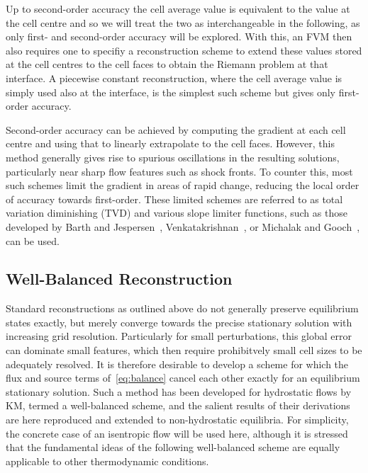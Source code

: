 Up to second-order accuracy the cell average value is equivalent to the value at the cell centre and so we will treat the two as interchangeable in the following, as only first- and second-order accuracy will be explored. With this, an FVM then also requires one to specifiy a reconstruction scheme to extend these values stored at the cell centres to the cell faces to obtain the Riemann problem at that interface. A piecewise constant reconstruction, where the cell average value is simply used also at the interface, is the simplest such scheme but gives only first-order accuracy.

Second-order accuracy can be achieved by computing the gradient at each cell centre and using that to linearly extrapolate to the cell faces. However, this method generally gives rise to spurious oscillations in the resulting solutions, particularly near sharp flow features such as shock fronts. To counter this, most such schemes limit the gradient in areas of rapid change, reducing the local order of accuracy towards first-order. These limited schemes are referred to as total variation diminishing (TVD) and various slope limiter functions, such as those developed by Barth and Jespersen~\cite{Barth1989}, Venkatakrishnan~\cite{Venkatakrishnan1993,Venkatakrishnan1995}, or Michalak and Gooch~\cite{Michalak2008}, can be used.

\subsection{Well-Balanced Reconstruction}
\label{subsec:wellBalanced}

Standard reconstructions as outlined above do not generally preserve equilibrium states exactly, but merely converge towards the precise stationary solution with increasing grid resolution. Particularly for small perturbations, this global error can dominate small features, which then require prohibitvely small cell sizes to be adequately resolved. It is therefore desirable to develop a scheme for which the flux and source terms of~\eqref{eq:balance} cancel each other exactly for an equilibrium stationary solution. Such a method has been developed for hydrostatic flows by KM, termed a well-balanced scheme, and the salient results of their derivations are here reproduced and extended to non-hydrostatic equilibria. For simplicity, the concrete case of an isentropic flow will be used here, although it is stressed that the fundamental ideas of the following well-balanced scheme are equally applicable to other thermodynamic conditions.

